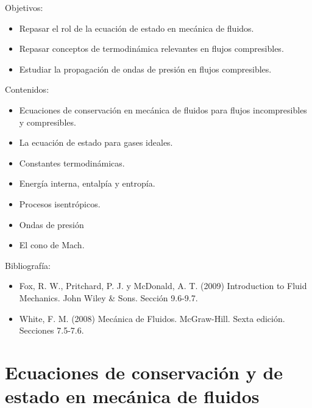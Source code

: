 \begin{framed}

Objetivos:
\begin{itemize}
    \item Repasar el rol de la ecuación de estado en mecánica de fluidos.
    \item Repasar conceptos de termodinámica relevantes en flujos compresibles.
    \item Estudiar la propagación de ondas de presión en flujos compresibles.
\end{itemize}

Contenidos:
\begin{itemize}
    \item Ecuaciones de conservación en mecánica de fluidos para flujos incompresibles y compresibles. 
    \item La ecuación de estado para gases ideales. 
    \item Constantes termodinámicas.
    \item Energía interna, entalpía y entropía.
    \item Procesos isentrópicos.
    \item Ondas de presión
    \item El cono de Mach. 
\end{itemize}

Bibliografía:
\begin{itemize}
    \item Fox, R. W., Pritchard, P. J. y McDonald, A. T. (2009) Introduction to Fluid Mechanics. John Wiley \& Sons. Sección 9.6-9.7.
    \item White, F. M. (2008) Mecánica de Fluidos. McGraw-Hill. Sexta edición. Secciones 7.5-7.6.
\end{itemize}
\end{framed}

\section*{Ecuaciones de conservación y de estado en mecánica de fluidos}

